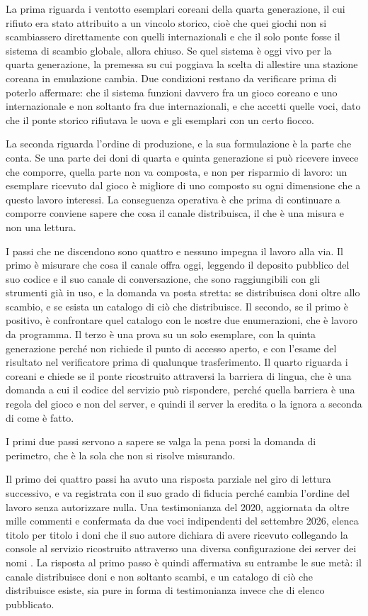 La prima riguarda i ventotto esemplari coreani della quarta generazione, il cui rifiuto era stato attribuito a un vincolo storico, cioè che quei giochi non si scambiassero direttamente con quelli internazionali e che il solo ponte fosse il sistema di scambio globale, allora chiuso. Se quel sistema è oggi vivo per la quarta generazione, la premessa su cui poggiava la scelta di allestire una stazione coreana in emulazione cambia. Due condizioni restano da verificare prima di poterlo affermare: che il sistema funzioni davvero fra un gioco coreano e uno internazionale e non soltanto fra due internazionali, e che accetti quelle voci, dato che il ponte storico rifiutava le uova e gli esemplari con un certo fiocco.

La seconda riguarda l'ordine di produzione, e la sua formulazione è la parte che conta. Se una parte dei doni di quarta e quinta generazione si può ricevere invece che comporre, quella parte non va composta, e non per risparmio di lavoro: un esemplare ricevuto dal gioco è migliore di uno composto su ogni dimensione che a questo lavoro interessi. La conseguenza operativa è che prima di continuare a comporre conviene sapere che cosa il canale distribuisca, il che è una misura e non una lettura.

I passi che ne discendono sono quattro e nessuno impegna il lavoro alla via. Il primo è misurare che cosa il canale offra oggi, leggendo il deposito pubblico del suo codice e il suo canale di conversazione, che sono raggiungibili con gli strumenti già in uso, e la domanda va posta stretta: se distribuisca doni oltre allo scambio, e se esista un catalogo di ciò che distribuisce. Il secondo, se il primo è positivo, è confrontare quel catalogo con le nostre due enumerazioni, che è lavoro da programma. Il terzo è una prova su un solo esemplare, con la quinta generazione perché non richiede il punto di accesso aperto, e con l'esame del risultato nel verificatore prima di qualunque trasferimento. Il quarto riguarda i coreani e chiede se il ponte ricostruito attraversi la barriera di lingua, che è una domanda a cui il codice del servizio può rispondere, perché quella barriera è una regola del gioco e non del server, e quindi il server la eredita o la ignora a seconda di come è fatto.

I primi due passi servono a sapere se valga la pena porsi la domanda di perimetro, che è la sola che non si risolve misurando.

Il primo dei quattro passi ha avuto una risposta parziale nel giro di lettura successivo, e va registrata con il suo grado di fiducia perché cambia l'ordine del lavoro senza autorizzare nulla. Una testimonianza del 2020, aggiornata da oltre mille commenti e confermata da due voci indipendenti del settembre 2026, elenca titolo per titolo i doni che il suo autore dichiara di avere ricevuto collegando la console al servizio ricostruito attraverso una diversa configurazione dei server dei nomi \cite{dns-eventi-gen45}. La risposta al primo passo è quindi affermativa su entrambe le sue metà: il canale distribuisce doni e non soltanto scambi, e un catalogo di ciò che distribuisce esiste, sia pure in forma di testimonianza invece che di elenco pubblicato.

